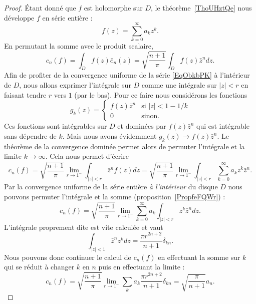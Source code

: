 \begin{proof}
    Étant donné que \( f\) est holomorphe sur \( D\), le théorème~\ref{ThoUHztQe} nous développe \( f\) en série entière :
    \begin{equation}    \label{EqObkbPK}
        f(z)=\sum_{k=0}^{\infty}a_kz^k.
    \end{equation}
    En permutant la somme avec le produit scalaire,
    \begin{equation}
        c_n(f)=\int_Df(z)\bar e_n(z)=\sqrt{\frac{ n+1 }{ \pi }}\int_Df(z)\bar z^ndz.
    \end{equation}
    Afin de profiter de la convergence uniforme de la série \eqref{EqObkbPK} à l'intérieur de \( D\), nous allons exprimer l'intégrale sur \( D\) comme une intégrale sur \( | z |<r\) en faisant tendre \( r\) vers \( 1\) (par le bas). Pour ce faire nous considérons les fonctions
    \begin{equation}
        g_k(z)=\begin{cases}
            f(z)\bar z^n    &   \text{si } | z |<1-1/k\\
            0    &    \text{sinon.}
        \end{cases}
    \end{equation}
    Ces fonctions sont intégrables sur \( D\) et dominées par \( f(z)\bar z^n\) qui est intégrable sans dépendre de \( k\). Mais nous avons évidemment \( g_k(z)\to f(z)\bar z^n\). Le théorème de la convergence dominée permet alors de permuter l'intégrale et la limite \( k\to \infty\). Cela nous permet d'écrire
    \begin{equation}
        c_n(f)=\sqrt{\frac{ n+1 }{ \pi }}\lim_{r\to 1^-}\int_{| z |<r}\bar z^nf(z)dz=\sqrt{\frac{ n+1 }{ \pi }}\lim_{r\to 1^-}\int_{| z |<r}\sum_{k=0}^{\infty}a_kz^k\bar z^n.
    \end{equation}
    Par la convergence uniforme de la série entière \emph{à l'intérieur} du disque \( D\) nous pouvons permuter l'intégrale et la somme (proposition~\ref{PropfeFQWr}) :
    \begin{equation}
        c_n(f)=\sqrt{\frac{ n+1 }{ \pi }}\lim_{r\to 1^-}\sum_{k=0}^{\infty}a_k\int_{| z |<r}z^k\bar z^ndz.
    \end{equation}
    L'intégrale proprement dite est vite calculée et vaut
    \begin{equation}
        \int_{| z |<1}\bar z^nz^kdz=\frac{ \pi r^{2n+2} }{ n+1 }\delta_{kn}.
    \end{equation}
    Nous pouvons donc continuer le calcul de \( c_n(f)\) en effectuant la somme sur \( k\) qui se réduit à changer \( k\) en \( n\) puis en effectuant la limite :
    \begin{equation}
        c_n(f)=\sqrt{\frac{ n+1 }{ \pi }}\lim_{r\to 1^-}\sum_ka_k\frac{ \pi r^{2n+2} }{ n+1 }\delta_{kn}=\sqrt{\frac{ \pi }{ n+1 }}a_n.
    \end{equation}


\end{proof}
